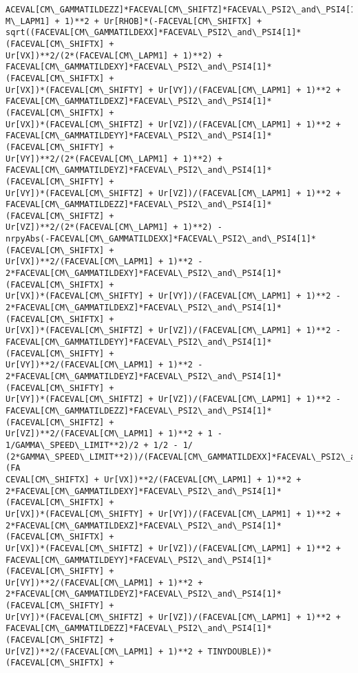 \documentclass[landscape,letterpaper,10pt,english]{article}
\begin{document}
\begin{Verbatim}[commandchars=\\\{\}]
ACEVAL[CM\_GAMMATILDEZZ]*FACEVAL[CM\_SHIFTZ]*FACEVAL\_PSI2\_and\_PSI4[1]))/(FACEVAL[C
M\_LAPM1] + 1)**2 + Ur[RHOB]*(-FACEVAL[CM\_SHIFTX] +
sqrt((FACEVAL[CM\_GAMMATILDEXX]*FACEVAL\_PSI2\_and\_PSI4[1]*(FACEVAL[CM\_SHIFTX] +
Ur[VX])**2/(2*(FACEVAL[CM\_LAPM1] + 1)**2) +
FACEVAL[CM\_GAMMATILDEXY]*FACEVAL\_PSI2\_and\_PSI4[1]*(FACEVAL[CM\_SHIFTX] +
Ur[VX])*(FACEVAL[CM\_SHIFTY] + Ur[VY])/(FACEVAL[CM\_LAPM1] + 1)**2 +
FACEVAL[CM\_GAMMATILDEXZ]*FACEVAL\_PSI2\_and\_PSI4[1]*(FACEVAL[CM\_SHIFTX] +
Ur[VX])*(FACEVAL[CM\_SHIFTZ] + Ur[VZ])/(FACEVAL[CM\_LAPM1] + 1)**2 +
FACEVAL[CM\_GAMMATILDEYY]*FACEVAL\_PSI2\_and\_PSI4[1]*(FACEVAL[CM\_SHIFTY] +
Ur[VY])**2/(2*(FACEVAL[CM\_LAPM1] + 1)**2) +
FACEVAL[CM\_GAMMATILDEYZ]*FACEVAL\_PSI2\_and\_PSI4[1]*(FACEVAL[CM\_SHIFTY] +
Ur[VY])*(FACEVAL[CM\_SHIFTZ] + Ur[VZ])/(FACEVAL[CM\_LAPM1] + 1)**2 +
FACEVAL[CM\_GAMMATILDEZZ]*FACEVAL\_PSI2\_and\_PSI4[1]*(FACEVAL[CM\_SHIFTZ] +
Ur[VZ])**2/(2*(FACEVAL[CM\_LAPM1] + 1)**2) -
nrpyAbs(-FACEVAL[CM\_GAMMATILDEXX]*FACEVAL\_PSI2\_and\_PSI4[1]*(FACEVAL[CM\_SHIFTX] +
Ur[VX])**2/(FACEVAL[CM\_LAPM1] + 1)**2 -
2*FACEVAL[CM\_GAMMATILDEXY]*FACEVAL\_PSI2\_and\_PSI4[1]*(FACEVAL[CM\_SHIFTX] +
Ur[VX])*(FACEVAL[CM\_SHIFTY] + Ur[VY])/(FACEVAL[CM\_LAPM1] + 1)**2 -
2*FACEVAL[CM\_GAMMATILDEXZ]*FACEVAL\_PSI2\_and\_PSI4[1]*(FACEVAL[CM\_SHIFTX] +
Ur[VX])*(FACEVAL[CM\_SHIFTZ] + Ur[VZ])/(FACEVAL[CM\_LAPM1] + 1)**2 -
FACEVAL[CM\_GAMMATILDEYY]*FACEVAL\_PSI2\_and\_PSI4[1]*(FACEVAL[CM\_SHIFTY] +
Ur[VY])**2/(FACEVAL[CM\_LAPM1] + 1)**2 -
2*FACEVAL[CM\_GAMMATILDEYZ]*FACEVAL\_PSI2\_and\_PSI4[1]*(FACEVAL[CM\_SHIFTY] +
Ur[VY])*(FACEVAL[CM\_SHIFTZ] + Ur[VZ])/(FACEVAL[CM\_LAPM1] + 1)**2 -
FACEVAL[CM\_GAMMATILDEZZ]*FACEVAL\_PSI2\_and\_PSI4[1]*(FACEVAL[CM\_SHIFTZ] +
Ur[VZ])**2/(FACEVAL[CM\_LAPM1] + 1)**2 + 1 - 1/GAMMA\_SPEED\_LIMIT**2)/2 + 1/2 - 1/
(2*GAMMA\_SPEED\_LIMIT**2))/(FACEVAL[CM\_GAMMATILDEXX]*FACEVAL\_PSI2\_and\_PSI4[1]*(FA
CEVAL[CM\_SHIFTX] + Ur[VX])**2/(FACEVAL[CM\_LAPM1] + 1)**2 +
2*FACEVAL[CM\_GAMMATILDEXY]*FACEVAL\_PSI2\_and\_PSI4[1]*(FACEVAL[CM\_SHIFTX] +
Ur[VX])*(FACEVAL[CM\_SHIFTY] + Ur[VY])/(FACEVAL[CM\_LAPM1] + 1)**2 +
2*FACEVAL[CM\_GAMMATILDEXZ]*FACEVAL\_PSI2\_and\_PSI4[1]*(FACEVAL[CM\_SHIFTX] +
Ur[VX])*(FACEVAL[CM\_SHIFTZ] + Ur[VZ])/(FACEVAL[CM\_LAPM1] + 1)**2 +
FACEVAL[CM\_GAMMATILDEYY]*FACEVAL\_PSI2\_and\_PSI4[1]*(FACEVAL[CM\_SHIFTY] +
Ur[VY])**2/(FACEVAL[CM\_LAPM1] + 1)**2 +
2*FACEVAL[CM\_GAMMATILDEYZ]*FACEVAL\_PSI2\_and\_PSI4[1]*(FACEVAL[CM\_SHIFTY] +
Ur[VY])*(FACEVAL[CM\_SHIFTZ] + Ur[VZ])/(FACEVAL[CM\_LAPM1] + 1)**2 +
FACEVAL[CM\_GAMMATILDEZZ]*FACEVAL\_PSI2\_and\_PSI4[1]*(FACEVAL[CM\_SHIFTZ] +
Ur[VZ])**2/(FACEVAL[CM\_LAPM1] + 1)**2 + TINYDOUBLE))*(FACEVAL[CM\_SHIFTX] +

\end{Verbatim}
\end{document}
